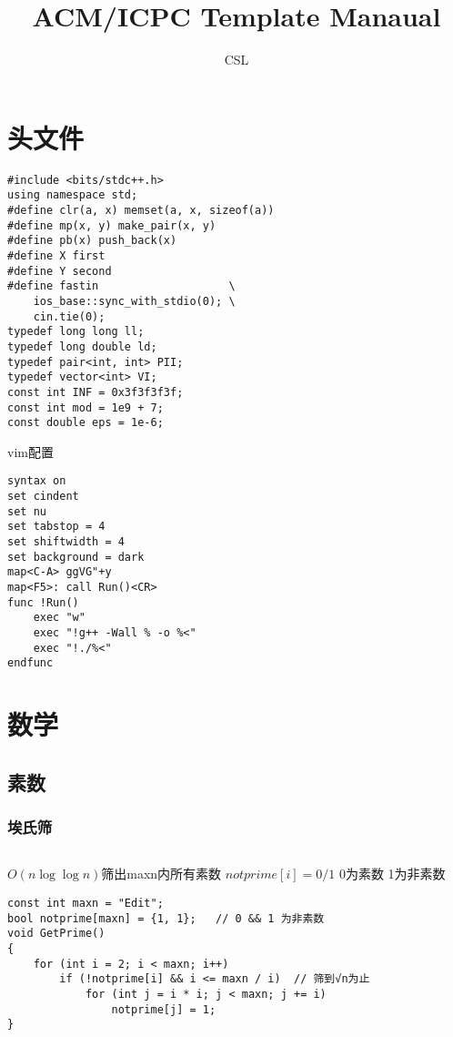 \documentclass[a4]{article}
\title{ACM/ICPC Template Manaual}
\author{CSL}
\begin{document}
\large
\begin{titlepage}
\maketitle\setcounter{page}{0}\thispagestyle{empty}\clearpage
\clearpage
\tableofcontents\clearpage
\end{titlepage}
\setcounter{section}{-1}
\clearpage\section{头文件}
\begin{lstlisting}
#include <bits/stdc++.h>
using namespace std;
#define clr(a, x) memset(a, x, sizeof(a))
#define mp(x, y) make_pair(x, y)
#define pb(x) push_back(x)
#define X first
#define Y second
#define fastin                    \
    ios_base::sync_with_stdio(0); \
    cin.tie(0);
typedef long long ll;
typedef long double ld;
typedef pair<int, int> PII;
typedef vector<int> VI;
const int INF = 0x3f3f3f3f;
const int mod = 1e9 + 7;
const double eps = 1e-6;
\end{lstlisting}
vim配置
\begin{lstlisting}
syntax on
set cindent
set nu
set tabstop = 4
set shiftwidth = 4
set background = dark
map<C-A> ggVG"+y
map<F5>: call Run()<CR>
func !Run()
    exec "w"
    exec "!g++ -Wall % -o %<"
    exec "!./%<"
endfunc
\end{lstlisting}
\clearpage\section{数学}
\subsection{素数}
\subsubsection{埃氏筛}
\begin{lstlisting}
\end{lstlisting}
$O(n\log\log n)$筛出maxn内所有素数
$notprime[i] = 0/1$ 0为素数 1为非素数
\begin{lstlisting}
const int maxn = "Edit";
bool notprime[maxn] = {1, 1};   // 0 && 1 为非素数
void GetPrime()
{
    for (int i = 2; i < maxn; i++)
        if (!notprime[i] && i <= maxn / i)  // 筛到√n为止
            for (int j = i * i; j < maxn; j += i)
                notprime[j] = 1;
}
\end{lstlisting}
\end{document}
